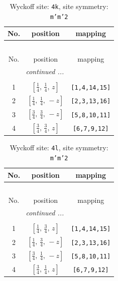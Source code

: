 \documentclass[fleqn,8pt]{jsarticle}
\begin{document}
\renewcommand{\arraystretch}{1.2}
\begin{longtable}{ccc}
\caption{Wyckoff site: {\tt 4k}, site symmetry: {\tt m'm'2}}
 \\
 \hline \hline
No. & position & mapping \\ \hline \endfirsthead

\multicolumn{2}{l}{\tablename\ \thetable{}} \\
 \hline \hline
No. & position & mapping \\ \hline \endhead

 \hline \hline
\multicolumn{2}{r}{\footnotesize\it continued ...} \\ \endfoot

 \hline \hline
\multicolumn{2}{r}{} \\ \endlastfoot

1 & $\left[ \frac{1}{4},\, \frac{1}{4},\, z \right]$ & {\tt [1,4,14,15]} \\ \hline
2 & $\left[ \frac{1}{4},\, \frac{1}{4},\, - z \right]$ & {\tt [2,3,13,16]} \\ \hline
3 & $\left[ \frac{3}{4},\, \frac{3}{4},\, - z \right]$ & {\tt [5,8,10,11]} \\ \hline
4 & $\left[ \frac{3}{4},\, \frac{3}{4},\, z \right]$ & {\tt [6,7,9,12]} \\
\end{longtable}
\renewcommand{\arraystretch}{1.2}
\begin{longtable}{ccc}
\caption{Wyckoff site: {\tt 4l}, site symmetry: {\tt m'm'2}}
 \\
 \hline \hline
No. & position & mapping \\ \hline \endfirsthead

\multicolumn{2}{l}{\tablename\ \thetable{}} \\
 \hline \hline
No. & position & mapping \\ \hline \endhead

 \hline \hline
\multicolumn{2}{r}{\footnotesize\it continued ...} \\ \endfoot

 \hline \hline
\multicolumn{2}{r}{} \\ \endlastfoot

1 & $\left[ \frac{1}{4},\, \frac{3}{4},\, z \right]$ & {\tt [1,4,14,15]} \\ \hline
2 & $\left[ \frac{1}{4},\, \frac{3}{4},\, - z \right]$ & {\tt [2,3,13,16]} \\ \hline
3 & $\left[ \frac{3}{4},\, \frac{1}{4},\, - z \right]$ & {\tt [5,8,10,11]} \\ \hline
4 & $\left[ \frac{3}{4},\, \frac{1}{4},\, z \right]$ & {\tt [6,7,9,12]} \\
\end{longtable}
\end{document}
